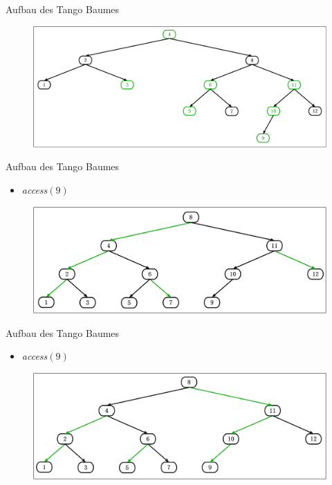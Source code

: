 \documentclass[11pt]{beamer}
\begin{document}
\begin{frame} {Aufbau des Tango Baumes}
	\begin{figure}[H]
		\centering
		\includegraphics[width=1\textwidth]{"Medien/pres/tangoBaum"}
	\end{figure}
\end{frame}

\begin{frame} {Aufbau des Tango Baumes}
	\begin{itemize}
		\item \textit{access}$\left(9\right)$
	\end{itemize}
	\begin{figure}[H]
		\centering
		\includegraphics[width=1\textwidth]{"Medien/pres/prefChilds"}
	\end{figure}

\end{frame}

\begin{frame} {Aufbau des Tango Baumes}
	\begin{itemize}
		\item \textit{access}$\left(9\right)$
	\end{itemize}
	\begin{figure}[H]
		\centering
		\includegraphics[width=1\textwidth]{"Medien/pres/prefChilds2"}
	\end{figure}
	
\end{frame}
\end{document}
